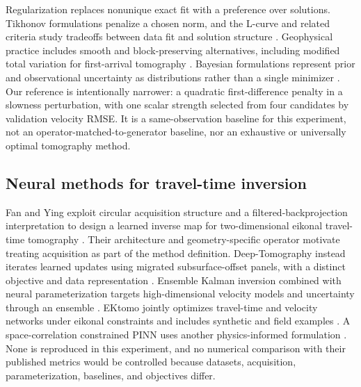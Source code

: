 \documentclass[11pt]{article}
\begin{document}
Regularization replaces nonunique exact fit with a preference over solutions. Tikhonov formulations penalize a chosen norm, and the L-curve and related criteria study tradeoffs between data fit and solution structure \cite{Tikhonov1977,Hansen1992}. Geophysical practice includes smooth and block-preserving alternatives, including modified total variation for first-arrival tomography \cite{Constable1987,Jiang2016,Jiang2018}. Bayesian formulations represent prior and observational uncertainty as distributions rather than a single minimizer \cite{TarantolaValette1982,ScalesSnieder1997,Zhao2022}. Our reference is intentionally narrower: a quadratic first-difference penalty in a slowness perturbation, with one scalar strength selected from four candidates by validation velocity RMSE. It is a same-observation baseline for this experiment, not an operator-matched-to-generator baseline, nor an exhaustive or universally optimal tomography method.

\subsection{Neural methods for travel-time inversion}
\label{sec:related-neural}
Fan and Ying exploit circular acquisition structure and a filtered-backprojection interpretation to design a learned inverse map for two-dimensional eikonal travel-time tomography \cite{FanYing2023}. Their architecture and geometry-specific operator motivate treating acquisition as part of the method definition. Deep-Tomography instead iterates learned updates using migrated subsurface-offset panels, with a distinct objective and data representation \cite{Muller2023}. Ensemble Kalman inversion combined with neural parameterization targets high-dimensional velocity models and uncertainty through an ensemble \cite{LiEKI2025}. EKtomo jointly optimizes travel-time and velocity networks under eikonal constraints and includes synthetic and field examples \cite{Zeng2026}. A space-correlation constrained PINN uses another physics-informed formulation \cite{WangSpace2026}. None is reproduced in this experiment, and no numerical comparison with their published metrics would be controlled because datasets, acquisition, parameterization, baselines, and objectives differ.
\end{document}
